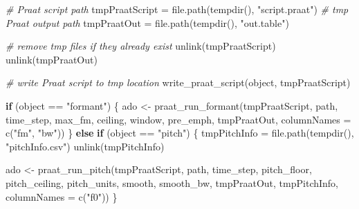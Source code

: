 \documentclass[
]{book}
\newenvironment{Shaded}{\begin{snugshade}}{\end{snugshade}}
\newcommand{\AttributeTok}[1]{\textcolor[rgb]{0.77,0.63,0.00}{#1}}
\newcommand{\CommentTok}[1]{\textcolor[rgb]{0.56,0.35,0.01}{\textit{#1}}}
\newcommand{\ControlFlowTok}[1]{\textcolor[rgb]{0.13,0.29,0.53}{\textbf{#1}}}
\newcommand{\FunctionTok}[1]{\textcolor[rgb]{0.00,0.00,0.00}{#1}}
\newcommand{\NormalTok}[1]{#1}
\newcommand{\OtherTok}[1]{\textcolor[rgb]{0.56,0.35,0.01}{#1}}
\newcommand{\SpecialCharTok}[1]{\textcolor[rgb]{0.00,0.00,0.00}{#1}}
\newcommand{\StringTok}[1]{\textcolor[rgb]{0.31,0.60,0.02}{#1}}
\begin{document}
\begin{Shaded}
\begin{Highlighting}[]
  \CommentTok{\# Praat script path}
\NormalTok{  tmpPraatScript }\OtherTok{=} \FunctionTok{file.path}\NormalTok{(}\FunctionTok{tempdir}\NormalTok{(), }\StringTok{"script.praat"}\NormalTok{)}
  \CommentTok{\# tmp Praat output path}
\NormalTok{  tmpPraatOut }\OtherTok{=} \FunctionTok{file.path}\NormalTok{(}\FunctionTok{tempdir}\NormalTok{(), }\StringTok{"out.table"}\NormalTok{)}

  \CommentTok{\# remove tmp files if they already exist}
  \FunctionTok{unlink}\NormalTok{(tmpPraatScript)}
  \FunctionTok{unlink}\NormalTok{(tmpPraatOut)}

  \CommentTok{\# write Praat script to tmp location}
  \FunctionTok{write\_praat\_script}\NormalTok{(object, tmpPraatScript)}

  \ControlFlowTok{if}\NormalTok{ (object }\SpecialCharTok{==} \StringTok{"formant"}\NormalTok{) \{}
\NormalTok{    ado }\OtherTok{\textless{}{-}} \FunctionTok{praat\_run\_formant}\NormalTok{(tmpPraatScript,}
\NormalTok{                             path,}
\NormalTok{                             time\_step,}
\NormalTok{                             max\_fm,}
\NormalTok{                             ceiling,}
\NormalTok{                             window,}
\NormalTok{                             pre\_emph,}
\NormalTok{                             tmpPraatOut,}
                             \AttributeTok{columnNames =} \FunctionTok{c}\NormalTok{(}\StringTok{"fm"}\NormalTok{, }\StringTok{"bw"}\NormalTok{))}
\NormalTok{  \} }\ControlFlowTok{else} \ControlFlowTok{if}\NormalTok{ (object }\SpecialCharTok{==} \StringTok{"pitch"}\NormalTok{) \{}
\NormalTok{    tmpPitchInfo }\OtherTok{=} \FunctionTok{file.path}\NormalTok{(}\FunctionTok{tempdir}\NormalTok{(), }\StringTok{"pitchInfo.csv"}\NormalTok{)}
    \FunctionTok{unlink}\NormalTok{(tmpPitchInfo)}

\NormalTok{    ado }\OtherTok{\textless{}{-}} \FunctionTok{praat\_run\_pitch}\NormalTok{(tmpPraatScript,}
\NormalTok{                            path,}
\NormalTok{                            time\_step,}
\NormalTok{                            pitch\_floor,}
\NormalTok{                            pitch\_ceiling,}
\NormalTok{                            pitch\_units,}
\NormalTok{                            smooth,}
\NormalTok{                            smooth\_bw,}
\NormalTok{                            tmpPraatOut,}
\NormalTok{                            tmpPitchInfo,}
                            \AttributeTok{columnNames =} \FunctionTok{c}\NormalTok{(}\StringTok{"f0"}\NormalTok{))}
\NormalTok{  \}}


\end{Highlighting}
\end{Shaded}
\end{document}
